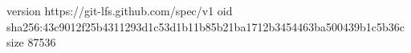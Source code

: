 version https://git-lfs.github.com/spec/v1
oid sha256:43c9012f25b4311293d1c53d1b11b85b21ba1712b3454463ba500439b1c5b36c
size 87536
